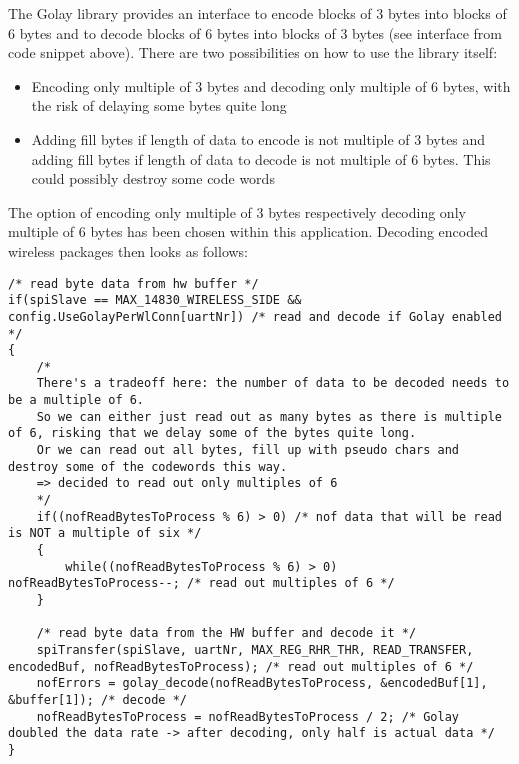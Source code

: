 The Golay library provides an interface to encode blocks of 3 bytes into blocks of 6 bytes and to decode blocks of 6 bytes into blocks of 3 bytes (see interface from code snippet above). There are two possibilities on how to use the library itself:
\begin{itemize}
    \item Encoding only multiple of 3 bytes and decoding only multiple of 6 bytes, with the risk of delaying some bytes quite long
    \item Adding fill bytes if length of data to encode is not multiple of 3 bytes and adding fill bytes if length of data to decode is not multiple of 6 bytes. This could possibly destroy some code words
\end{itemize}
The option of encoding only multiple of 3 bytes respectively decoding only multiple of 6 bytes has been chosen within this application. Decoding encoded wireless packages then looks as follows:\\
\begin{lstlisting}
/* read byte data from hw buffer */
if(spiSlave == MAX_14830_WIRELESS_SIDE && config.UseGolayPerWlConn[uartNr]) /* read and decode if Golay enabled */
{
    /*
    There's a tradeoff here: the number of data to be decoded needs to be a multiple of 6.
    So we can either just read out as many bytes as there is multiple of 6, risking that we delay some of the bytes quite long.
    Or we can read out all bytes, fill up with pseudo chars and destroy some of the codewords this way.
    => decided to read out only multiples of 6
    */
    if((nofReadBytesToProcess % 6) > 0) /* nof data that will be read is NOT a multiple of six */
    {
        while((nofReadBytesToProcess % 6) > 0)			nofReadBytesToProcess--; /* read out multiples of 6 */
    }
    
    /* read byte data from the HW buffer and decode it */
    spiTransfer(spiSlave, uartNr, MAX_REG_RHR_THR, READ_TRANSFER, encodedBuf, nofReadBytesToProcess); /* read out multiples of 6 */
    nofErrors = golay_decode(nofReadBytesToProcess, &encodedBuf[1], &buffer[1]); /* decode */
    nofReadBytesToProcess = nofReadBytesToProcess / 2; /* Golay doubled the data rate -> after decoding, only half is actual data */
}
\end{lstlisting}
%
